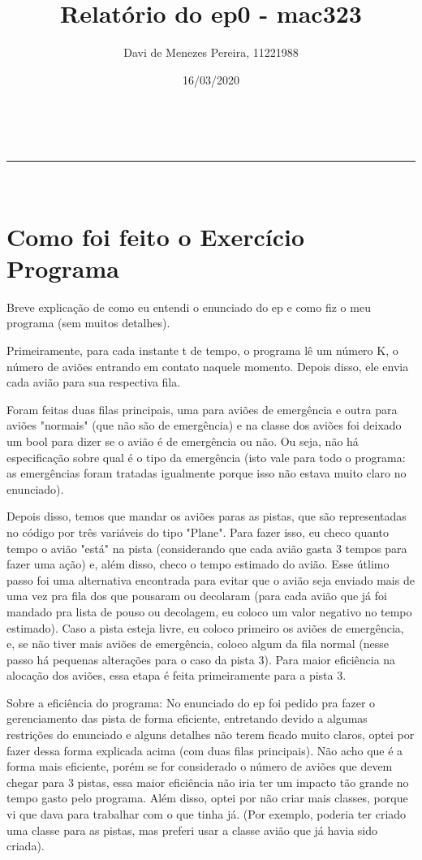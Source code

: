 \documentclass[a4paper,11pt]{article}
\makeatletter
\newcommand{\linia}{\rule{\linewidth}{0.5pt}}
\theoremstyle{mytheor}
\renewcommand{\maketitle}{
\begin{center}
\vspace{2ex}
{\huge \textsc{\@title}}
\vspace{1ex}
\\
\linia\\
\@author \hfill \@date
\vspace{4ex}
\end{center}
}
\makeatother
\begin{document}
\title{Relatório do ep0 - mac323}

\author{Davi de Menezes Pereira, 11221988}

\date{16/03/2020}

\maketitle

\section*{Como foi feito o Exercício Programa}

Breve explicação de como eu entendi o enunciado do ep e como fiz o meu programa (sem muitos detalhes). \newline

Primeiramente, para cada instante t de tempo, o programa lê um número K, o número de aviões entrando em contato naquele momento. Depois disso, ele envia cada avião para sua respectiva fila.\newline

Foram feitas duas filas principais, uma para aviões de emergência e outra para aviões "normais" (que não são de emergência) e na classe dos aviões foi deixado um bool para dizer se o avião é de emergência ou não. Ou seja, não há especificação sobre qual é o tipo da emergência (isto vale para todo o programa: as emergências foram tratadas igualmente porque isso não estava muito claro no enunciado).\newline

Depois disso, temos que mandar os aviões paras as pistas, que são representadas no código por três variáveis do tipo "Plane". 
Para fazer isso, eu checo quanto tempo o avião "está" na pista (considerando que cada avião gasta 3 tempos para fazer uma ação) e, além disso, checo o tempo estimado do avião.
Esse útlimo passo foi uma alternativa encontrada para evitar que o avião seja enviado mais de uma vez pra fila dos que pousaram ou decolaram (para cada avião que já foi mandado pra lista de pouso ou decolagem, eu coloco um valor negativo no tempo estimado). Caso a pista esteja livre, eu coloco primeiro os aviões de emergência, e, se não tiver mais aviões de emergência, coloco algum da fila normal (nesse passo há pequenas alterações para o caso da pista 3). Para maior eficiência na alocação dos aviões, essa etapa é feita primeiramente para a pista 3.\newline

Sobre a eficiência do programa: No enunciado do ep foi pedido pra fazer o gerenciamento das pista de forma eficiente, entretando devido a algumas restrições do enunciado e alguns detalhes não terem ficado muito claros, optei por fazer dessa forma explicada acima (com duas filas principais). Não acho que é a forma mais eficiente, porém se for considerado o número de aviões que devem chegar para 3 pistas, essa maior eficiência não iria ter um impacto tão grande no tempo gasto pelo programa. Além disso, optei por não criar mais classes, porque vi que dava para trabalhar com o que tinha já. (Por exemplo, poderia ter criado uma classe para as pistas, mas preferi usar a classe avião que já havia sido criada).\newline
\end{document}
